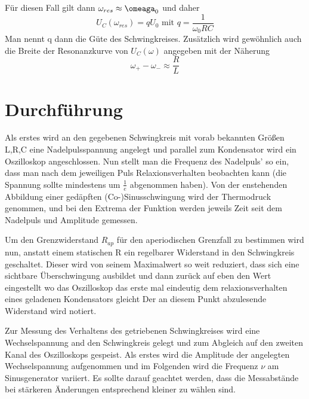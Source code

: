 \documentclass{scrartcl}
\begin{document}
         Für diesen Fall gilt dann $\omega_{res} \approx \omeaga_0$ und daher
         \begin{equation}
             \label{eqn:Güte}
             U_C(\omega_{res})= qU_0
             \text { mit }
              q=\frac{1}{\omega_0 RC}
         \end{equation}
         Man nennt q dann die Güte des Schwingkreises. Zusätzlich wird gewöhnlich auch die Breite der Resonanzkurve von $U_C(\omega)$ angegeben
         mit der Näherung
         \begin{equation}
             \label{eqn:Breite}
             \omega_+ -\omega_- \approx \frac{R}{L}
         \end{equation}

     \section{Durchführung}
     \label{sec:Durchführung}
     Als erstes wird an den gegebenen Schwingkreis mit vorab bekannten Größen L,R,C
     eine Nadelpulsspannung angelegt und parallel zum Kondensator wird ein Oszilloskop angeschlossen.
     Nun stellt man die Frequenz des Nadelpuls' so ein, dass man nach dem jeweiligen Puls Relaxionsverhalten beobachten kann
     (die Spannung sollte mindestens um $\frac{1}{e}$ abgenommen haben).
     Von der enstehenden Abbildung einer gedäpften (Co-)Sinusschwingung wird der Thermodruck genommen,
     und bei den Extrema der Funktion werden jeweils Zeit seit dem Nadelpuls und Amplitude gemessen.

     Um den Grenzwiderstand $R_{ap}$ für den aperiodischen Grenzfall zu bestimmen wird nun,
     anstatt einem statischen R ein regelbarer Widerstand in den Schwingkreis geschaltet.
     Dieser wird von seinem Maximalwert so weit reduziert, dass sich eine sichtbare Überschwingung ausbildet
     und dann zurück auf eben den Wert eingestellt wo das Oszilloskop das erste mal eindeutig dem relaxionsverhalten eines geladenen Kondensators gleicht
     Der an diesem Punkt abzulesende Widerstand wird notiert.

     Zur Messung des Verhaltens des getriebenen Schwingkreises wird eine Wechselspannung and den Schwingkreis gelegt
     und zum Abgleich auf den zweiten Kanal des Oszilloskops gespeist.
     Als erstes wird die Amplitude der angelegten Wechselspannung aufgenommen
     und im Folgenden wird die Frequenz $\nu$ am Sinusgenerator variiert.
     Es sollte darauf geachtet werden, dass die Messabstände bei stärkeren Änderungen entsprechend kleiner zu wählen sind.
\end{document}
